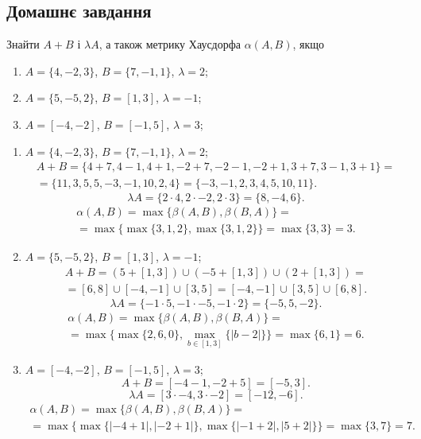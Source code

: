
\subsection{Домашнє завдання}

\begin{problem}
    Знайти $A + B$ і $\lambda A$, а також метрику Хаусдорфа $\alpha(A, B)$, якщо
    \begin{enumerate}
        \item $A = \{4,-2,3\}$, $B = \{7,-1,1\}$, $\lambda=2$;
        \item $A = \{5,-5,2\}$, $B = [1,3]$, $\lambda=-1$;
        \item $A = [-4,-2]$, $B = [-1,5]$, $\lambda=3$;
    \end{enumerate}
\end{problem}

\begin{solution}
    \begin{enumerate}
        \item $A = \{4,-2,3\}$, $B = \{7,-1,1\}$, $\lambda=2$;
        \begin{multline*} 
            A + B = \{4+7,4-1,4+1,-2+7,-2-1,-2+1,3+7,3-1,3+1\}= \\
            = \{11,3,5,5,-3,-1,10,2,4\} = \{-3,-1,2,3,4,5,10,11\}.
        \end{multline*} 
        \[ \lambda A = \{2 \cdot 4, 2 \cdot -2, 2 \cdot 3\} = \{8, -4, 6\}. \]
        \begin{multline*} 
            \alpha(A,B) = \max\{\beta(A,B),\beta(B,A)\} = \\
            = \max\{\max\{3,1,2\},\max\{3,1,2\}\}=\max\{3,3\}=3.
        \end{multline*} 
        \item $A = \{5,-5,2\}$, $B = [1,3]$, $\lambda=-1$;
        \begin{multline*} 
            A + B = (5 + [1,3]) \cup (-5 + [1,3]) \cup (2+[1,3])= \\
            = [6,8] \cup [-4,-1] \cup [3,5] = [-4,-1] \cup [3,5] \cup [6,8].
        \end{multline*} 
        \[ \lambda A = \{-1 \cdot 5, -1 \cdot -5, -1 \cdot 2\} = \{-5, 5, -2\}. \]
        \begin{multline*} 
            \alpha(A,B) = \max\{\beta(A,B),\beta(B,A)\} = \\
            = \max\{\max\{2,6,0\},\max_{b\in[1,3]}\{|b-2|\}\}=\max\{6,1\}=6.
        \end{multline*} 
        \item $A = [-4,-2]$, $B = [-1,5]$, $\lambda=3$;
        \[ A + B = [-4-1,-2+5] = [-5,3]. \]
        \[ \lambda A = [3 \cdot -4, 3 \cdot -2] = [-12, -6]. \]
        \begin{multline*} 
            \alpha(A,B) = \max\{\beta(A,B),\beta(B,A)\} = \\
            = \max\{\max\{|-4+1|,|-2+1|\},\max\{|-1+2|,|5+2|\}\}=\max\{3,7\}=7.
        \end{multline*}
    \end{enumerate}
\end{solution}

